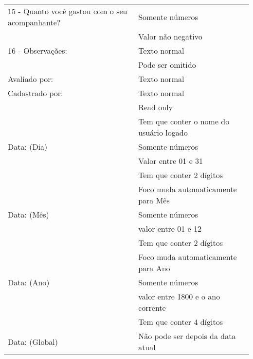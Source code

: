 \begin{longtable}{p{}|p{}}
15 - Quanto você gastou com o seu acompanhante? & Somente números \\ \cline{2-2} & Valor não negativo \\ \hline

16 - Observações: & Texto normal \\ \cline{2-2} & Pode ser omitido \\ \hline

Avaliado por: & Texto normal \\ \hline

Cadastrado por: & Texto normal \\ \cline{2-2} & Read only \\ \cline{2-2} & Tem que conter o nome do usuário logado \\ \hline

Data: (Dia) & Somente números \\ \cline{2-2} & Valor entre 01 e 31 \\ \cline{2-2} & Tem que conter 2 dígitos \\ \cline{2-2} & Foco muda automaticamente para Mês \\ \hline
Data: (Mês) & Somente números \\ \cline{2-2} & valor entre 01 e 12 \\ \cline{2-2} & Tem que conter 2 dígitos \\ \cline{2-2} & Foco muda automaticamente para Ano \\ \hline
Data: (Ano) & Somente números \\ \cline{2-2} & valor entre 1800 e o ano corrente \\ \cline{2-2} & Tem que conter 4 dígitos \\ \hline
Data: (Global) & Não pode ser depois da data atual \\ \hline

\end{longtable}
